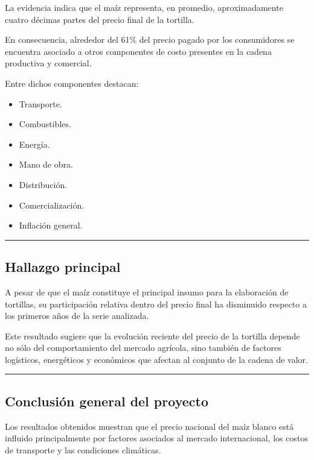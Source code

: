 \documentclass[11pt]{article}
\providecommand{\tightlist}{%
      \setlength{\itemsep}{0pt}\setlength{\parskip}{0pt}}
\begin{document}
La evidencia indica que el maíz representa, en promedio, aproximadamente
cuatro décimas partes del precio final de la tortilla.

En consecuencia, alrededor del 61\% del precio pagado por los
consumidores se encuentra asociado a otros componentes de costo
presentes en la cadena productiva y comercial.

Entre dichos componentes destacan:

\begin{itemize}
\tightlist
\item
  Transporte.
\item
  Combustibles.
\item
  Energía.
\item
  Mano de obra.
\item
  Distribución.
\item
  Comercialización.
\item
  Inflación general.
\end{itemize}

\begin{center}\rule{0.5\linewidth}{0.5pt}\end{center}

\hypertarget{hallazgo-principal}{%
\subsection{Hallazgo principal}\label{hallazgo-principal}}

A pesar de que el maíz constituye el principal insumo para la
elaboración de tortillas, su participación relativa dentro del precio
final ha disminuido respecto a los primeros años de la serie analizada.

Este resultado sugiere que la evolución reciente del precio de la
tortilla depende no sólo del comportamiento del mercado agrícola, sino
también de factores logísticos, energéticos y económicos que afectan al
conjunto de la cadena de valor.

\begin{center}\rule{0.5\linewidth}{0.5pt}\end{center}

\hypertarget{conclusiuxf3n-general-del-proyecto}{%
\subsection{Conclusión general del
proyecto}\label{conclusiuxf3n-general-del-proyecto}}

Los resultados obtenidos muestran que el precio nacional del maíz blanco
está influido principalmente por factores asociados al mercado
internacional, los costos de transporte y las condiciones climáticas.
\end{document}
